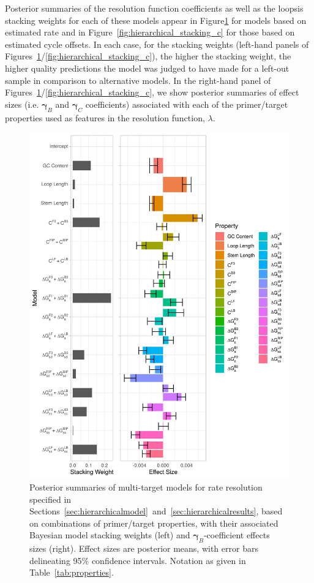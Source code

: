 \documentclass[../thesis.tex]{subfiles}
\begin{document}
Posterior summaries of the resolution function coefficients as well as the \gls{loopsis} stacking weights for each of these models appear in Figure\ref{fig:hierarchical_stacking_b} for models based on estimated rate and in Figure~\ref{fig:hierarchical_stacking_c} for those based on estimated cycle offsets. In each case, for the stacking weights (left-hand panels of Figures~\ref{fig:hierarchical_stacking_b}/\ref{fig:hierarchical_stacking_c}), the higher the stacking weight, the higher quality predictions the model was judged to have made for a left-out sample in comparison to alternative models. In the right-hand panel of Figures~\ref{fig:hierarchical_stacking_b}/\ref{fig:hierarchical_stacking_c}, we show posterior summaries of effect sizes (i.e. $\bm{\gamma}_B$ and $\bm{\gamma}_C$ coefficients) associated with each of the primer/target properties used as features in the resolution function, $\lambda$. 

\begin{figure}[!tpb] 
\centering
\includegraphics[width=5in]{../figures/chapter2/bhm_eval_fig.png}
\caption{Posterior summaries of multi-target models for rate resolution specified in Sections~\ref{sec:hierarchicalmodel}~and~\ref{sec:hierarchicalresults}, based on combinations of primer/target properties, with their associated Bayesian model stacking weights (left) and $\bm{\gamma}_B$-coefficient effects sizes (right). Effect sizes are posterior means, with error bars delineating 95\% confidence intervals. Notation as given in Table~\ref{tab:properties}.\label{fig:hierarchical_stacking_b}}
\end{figure}
\end{document}
